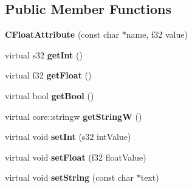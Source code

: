 \subsection*{Public Member Functions}
\begin{DoxyCompactItemize}
\item 
\hypertarget{classirr_1_1io_1_1_c_float_attribute_a4c4328c7ec0bde3f8e5675da8f24c0f7}{{\bfseries C\-Float\-Attribute} (const char $\ast$name, f32 value)}\label{classirr_1_1io_1_1_c_float_attribute_a4c4328c7ec0bde3f8e5675da8f24c0f7}

\item 
\hypertarget{classirr_1_1io_1_1_c_float_attribute_a45518df6a423f6ff5c05464f4a870abb}{virtual s32 {\bfseries get\-Int} ()}\label{classirr_1_1io_1_1_c_float_attribute_a45518df6a423f6ff5c05464f4a870abb}

\item 
\hypertarget{classirr_1_1io_1_1_c_float_attribute_aa5cc6889766bd03391c1c97a44bd97eb}{virtual f32 {\bfseries get\-Float} ()}\label{classirr_1_1io_1_1_c_float_attribute_aa5cc6889766bd03391c1c97a44bd97eb}

\item 
\hypertarget{classirr_1_1io_1_1_c_float_attribute_a148eb83131705f428c0c6159b955c3f3}{virtual bool {\bfseries get\-Bool} ()}\label{classirr_1_1io_1_1_c_float_attribute_a148eb83131705f428c0c6159b955c3f3}

\item 
\hypertarget{classirr_1_1io_1_1_c_float_attribute_a9aa4240cec8eab2d6474b0cf55859546}{virtual core\-::stringw {\bfseries get\-String\-W} ()}\label{classirr_1_1io_1_1_c_float_attribute_a9aa4240cec8eab2d6474b0cf55859546}

\item 
\hypertarget{classirr_1_1io_1_1_c_float_attribute_a7dec8ad2a012a75beb8a8180f965fe4c}{virtual void {\bfseries set\-Int} (s32 int\-Value)}\label{classirr_1_1io_1_1_c_float_attribute_a7dec8ad2a012a75beb8a8180f965fe4c}

\item 
\hypertarget{classirr_1_1io_1_1_c_float_attribute_a2294d0f642f8ab22f26ecd82cb2dd4d0}{virtual void {\bfseries set\-Float} (f32 float\-Value)}\label{classirr_1_1io_1_1_c_float_attribute_a2294d0f642f8ab22f26ecd82cb2dd4d0}

\item 
\hypertarget{classirr_1_1io_1_1_c_float_attribute_af142c01634b99050b38fcbb516bf9cea}{virtual void {\bfseries set\-String} (const char $\ast$text)}\label{classirr_1_1io_1_1_c_float_attribute_af142c01634b99050b38fcbb516bf9cea}


\end{DoxyCompactItemize}
